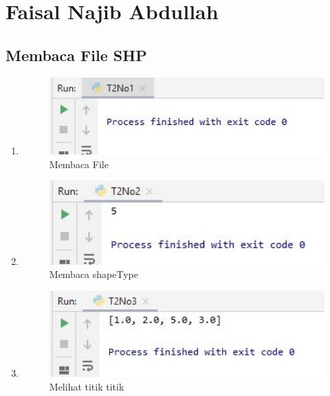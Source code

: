 \section{Faisal Najib Abdullah}
\subsection{Membaca File SHP}
\begin{enumerate}
	\item 
	
	\begin{figure}[H]
		\includegraphics[width=12cm]{figures/1174042/T2No1.JPG}
		\centering
		\caption{Membaca File}
	\end{figure}
	
	\item 
	
	\begin{figure}[H]
		\includegraphics[width=12cm]{figures/1174042/T2No2.JPG}
		\centering
		\caption{Membaca shapeType}
	\end{figure}
	
	\item 
	
	\begin{figure}[H]
		\includegraphics[width=12cm]{figures/1174042/T2No3.JPG}
		\centering
		\caption{Melihat titik titik}
	\end{figure}
	

\end{enumerate}

